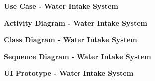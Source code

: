 \documentclass{article}
\begin{document}
\clearpage

\begin{figure}[htbp]
	\textbf{Use Case - Water Intake System}
	\centering
	\begin{subfigure}{\textwidth}
		\resizebox{\textwidth}{!}{}
	\end{subfigure}
	\begin{subfigure}{\textwidth}
	\end{subfigure}
\end{figure}

\clearpage

\begin{figure}[htbp]
	\textbf{Activity Diagram - Water Intake System}
	\centering
	\begin{subfigure}{\textwidth}
		\resizebox{\textwidth}{!}{}
	\end{subfigure}
	\begin{subfigure}{\textwidth}
	\end{subfigure}
\end{figure}

\clearpage

\begin{figure}[htbp]
	\textbf{Class Diagram - Water Intake System}
	\centering
	\begin{subfigure}{\textwidth}
		\resizebox{\textwidth}{!}{}
	\end{subfigure}
	\begin{subfigure}{\textwidth}
	\end{subfigure}
\end{figure}

\clearpage

\begin{figure}[htbp]
	\textbf{Sequence Diagram - Water Intake System}
	\centering
	\begin{subfigure}{\textwidth}
		\resizebox{\textwidth}{!}{}
	\end{subfigure}
	\begin{subfigure}{\textwidth}
	\end{subfigure}
\end{figure}

\clearpage

\begin{figure}[htbp]
	\textbf{UI Prototype - Water Intake System}
	\centering
	\begin{subfigure}{\textwidth}
		\resizebox{\textwidth}{!}{}	\end{subfigure}
	\begin{subfigure}{\textwidth}
	\end{subfigure}
\end{figure}
\end{document}
